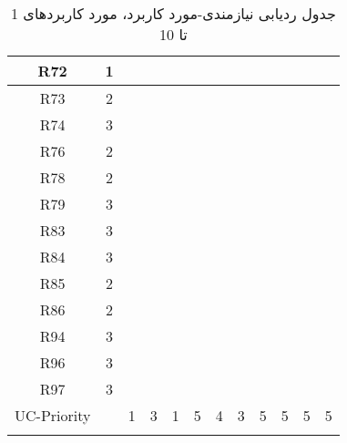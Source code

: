 \documentclass[12pt]{article}
\begin{document}
\begin{longtable}{|c|c|c|c|c|c|c|c|c|c|c|c|}
	\hline
	R72         & 1          &           &           &           &           &           &           &           &           &           &           \\
	\hline
	R73         & 2          &           &           &           &           &           &           &           &           &           &           \\
	\hline
	R74         & 3          &           &           &           &           &           &           &           &           &           &           \\
	\hline
	R76         & 2          &           &           &           &           &           &           &           &           &           &           \\
	\hline
	R78         & 2          &           &           &           &           &           &           &           &           &           &           \\
	\hline
	R79         & 3          &           &           &           &           &           &           &           &           &           &           \\
	\hline
	R83         & 3          &           &           &           &           &           &           &           &           &           &           \\
	\hline
	R84         & 3          &           &           &           &           &           &           &           &           &           &           \\
	\hline
	R85         & 2          &           &           &           &           &           &           &           &           &           &           \\
	\hline
	R86         & 2          &           &           &           &           &           &           &           &           &           &           \\
	\hline
	R94         & 3          &           &           &           &           &           &           &           &           &           &           \\
	\hline
	R96         & 3          &           &           &           &           &           &           &           &           &           &           \\
	\hline
	R97         & 3          &           &           &           &           &           &           &           &           &           &           \\
	\hline
	UC-Priority &            & 1         & 3         & 1         & 5         & 4         & 3         & 5         & 5         & 5         & 5         \\
	\hline
	\caption{جدول ردیابی نیازمندی-مورد کاربرد، مورد کاربردهای 1 تا 10}
\end{longtable}
\end{document}
